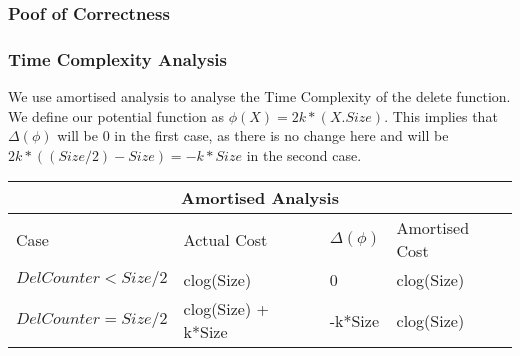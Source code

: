 \documentclass{article}
\begin{document}
\subsubsection{Poof of Correctness}

\subsubsection{Time Complexity Analysis}
We use amortised analysis to analyse the Time Complexity of the delete function. We define our potential function as $\phi(X) = 2k * (X.Size)$. This implies that $\Delta(\phi)$ will be $0$ in the first case, as there is no change here and will be $2k * ((Size/2)-Size) = -k*Size$ in the second case. \\
\begin{tabular}{ |p{4cm}|p{3cm}|p{3cm}|p{3cm}|  }
 \hline
 \multicolumn{4}{|c|}{Amortised Analysis} \\
 \hline
 Case & Actual Cost& $\Delta(\phi)$ & Amortised Cost\\
 \hline
 $DelCounter < Size/2$ & clog(Size)           & 0        & clog(Size)   \\
 $DelCounter = Size/2$ & clog(Size) + k*Size  & -k*Size  & clog(Size)  \\
 \hline
\end{tabular}
\newpage    
\end{document}
